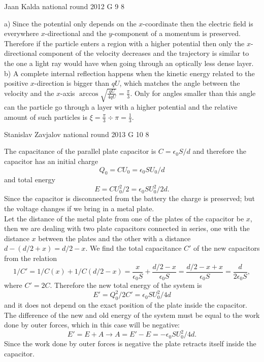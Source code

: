 \documentclass[11pt]{article}
\begin{document}
{Jaan Kalda} %
{national round} %
{2012} %
{G 9} %
{8} %
{

\ifEngSolution
a) Since the potential only depends on the $x$-coordinate then the electric field is everywhere $x$-directional and the $y$-component of a momentum is preserved. Therefore if the particle enters a region with a higher potential then only the $x$-directional component of the velocity decreases and the trajectory is similar to the one a light ray would have when going through an optically less dense layer.\\
b) A complete internal reflection happens when the kinetic energy related to the positive $x$-direction is bigger than $qU$, which matches the angle between the velocity and the $x$-axis $\arccos \sqrt{\frac {qU}{4qU}}=\frac \pi 3$. Only for angles smaller than this angle can the particle go through a layer with a higher potential and the relative amount of such particles is $\xi = \frac \pi 3 \div \pi = \frac 13$.
\fi
}

{Stanislav Zavjalov} %
{national round} %
{2013} %
{G 10} %
{8} %
{

\ifEngSolution
The capacitance of the parallel plate capacitor is $C = \epsilon_0 S / d$ and therefore the capacitor has an initial charge
$$Q_0 = C U_0 = \epsilon_0 S U_0/ d$$ 
and total energy 
$$E = C U_0^2 / 2 = \epsilon_0 S U_0^2/ 2 d.$$ 
Since the capacitor is disconnected from the battery the charge is preserved; but the voltage changes if we bring in a metal plate.\\
Let the distance of the metal plate from one of the plates of the capacitor be $x$, then we are dealing with two plate capacitors connected in series, one with the distance $x$ between the plates and the other with a distance $d - (d/2 + x) = d/2 - x$. We find the total capacitance $C'$ of the new capacitors from the relation
$$1/C' = 1/C(x) + 1/C(d/2-x) = \frac{x}{\epsilon_0 S} + \frac{d/2 - x}{\epsilon_0 S} = \frac{d/2 - x + x}{\epsilon_0 S} = \frac{d}{2 \epsilon_0 S},$$ 
where $C' = 2C$. Therefore the new total energy of the system is
$$E' = Q_0^2 / 2C' = \epsilon_0 S U_0^2/ 4 d$$
and it does not depend on the exact position of the plate inside the capacitor. The difference of the new and old energy of the system must be equal to the work done by outer forces, which in this case will be negative:
$$E' = E + A \rightarrow A = E' - E = - \epsilon_0 S U_0^2/ 4 d.$$ 
Since the work done by outer forces is negative the plate retracts itself inside the capacitor.
\fi
}
\end{document}
